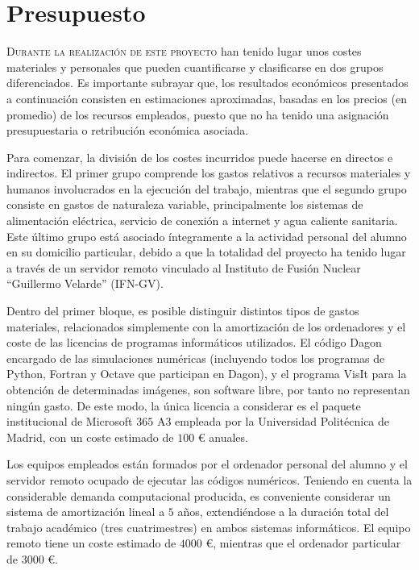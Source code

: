 \chapter{Presupuesto}\label{cap:10}
\lettrine{D}{urante la realización de este proyecto} han tenido lugar unos costes materiales y personales que pueden cuantificarse y clasificarse en dos grupos diferenciados. Es importante subrayar que, los resultados económicos presentados a continuación consisten en estimaciones aproximadas, basadas en los precios (en promedio) de los recursos empleados, puesto que no ha tenido una asignación presupuestaria o retribución económica asociada. 

Para comenzar, la división de los costes incurridos puede hacerse en directos e indirectos. El primer grupo comprende los gastos relativos a recursos materiales y humanos involucrados en la ejecución del trabajo, mientras que el segundo grupo consiste en gastos de naturaleza variable, principalmente los sistemas de alimentación eléctrica, servicio de conexión a internet y agua caliente sanitaria. Este último grupo está asociado íntegramente a la actividad personal del alumno en su domicilio particular, debido a que la totalidad del proyecto ha tenido lugar a través de un servidor remoto vinculado al Instituto de Fusión Nuclear \enquote{Guillermo Velarde} (IFN-GV). 

Dentro del primer bloque, es posible distinguir distintos tipos de gastos materiales, relacionados simplemente con la amortización de los ordenadores y el coste de las licencias de programas informáticos utilizados. El código Dagon encargado de las simulaciones numéricas (incluyendo todos los programas de Python, Fortran y Octave que participan en Dagon), y el programa VisIt para la obtención de determinadas imágenes, son software libre, por tanto no representan ningún gasto. De este modo, la única licencia a considerar es el paquete institucional de Microsoft $365$ A3 empleada por la Universidad Politécnica de Madrid, con un coste estimado de $100$ € anuales.

Los equipos empleados están formados por el ordenador personal del alumno y el servidor remoto ocupado de ejecutar las códigos numéricos. Teniendo en cuenta la considerable demanda computacional producida, es conveniente considerar un sistema de amortización lineal a $5$ años, extendiéndose a la duración total del trabajo académico (tres cuatrimestres) en ambos sistemas informáticos. El equipo remoto tiene un coste estimado de $4000$ €, mientras que el ordenador particular de $3000$ €. 

